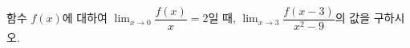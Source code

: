 함수 $f(x)$에 대하여 $\displaystyle\lim_{x\to 0}\dfrac{f(x)}{x}=2$일 때, $\displaystyle\lim_{x\to 3}\dfrac{f(x-3)}{x^2-9}$의 값을 구하시오.
